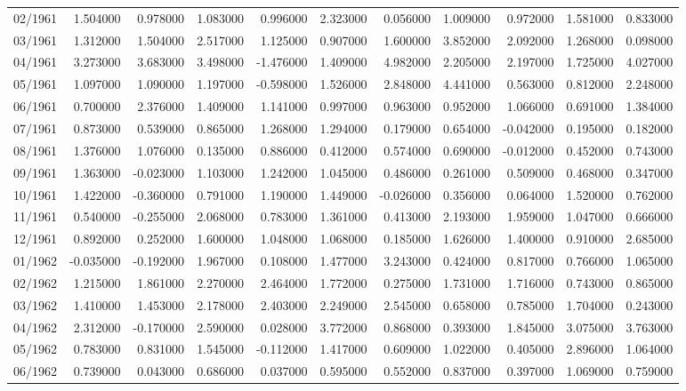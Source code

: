 \begin{tabular}{lrrrrrrrrrr}
02/1961 & 1.504000 & 0.978000 & 1.083000 & 0.996000 & 2.323000 & 0.056000 & 1.009000 & 0.972000 & 1.581000 & 0.833000 \\
03/1961 & 1.312000 & 1.504000 & 2.517000 & 1.125000 & 0.907000 & 1.600000 & 3.852000 & 2.092000 & 1.268000 & 0.098000 \\
04/1961 & 3.273000 & 3.683000 & 3.498000 & -1.476000 & 1.409000 & 4.982000 & 2.205000 & 2.197000 & 1.725000 & 4.027000 \\
05/1961 & 1.097000 & 1.090000 & 1.197000 & -0.598000 & 1.526000 & 2.848000 & 4.441000 & 0.563000 & 0.812000 & 2.248000 \\
06/1961 & 0.700000 & 2.376000 & 1.409000 & 1.141000 & 0.997000 & 0.963000 & 0.952000 & 1.066000 & 0.691000 & 1.384000 \\
07/1961 & 0.873000 & 0.539000 & 0.865000 & 1.268000 & 1.294000 & 0.179000 & 0.654000 & -0.042000 & 0.195000 & 0.182000 \\
08/1961 & 1.376000 & 1.076000 & 0.135000 & 0.886000 & 0.412000 & 0.574000 & 0.690000 & -0.012000 & 0.452000 & 0.743000 \\
09/1961 & 1.363000 & -0.023000 & 1.103000 & 1.242000 & 1.045000 & 0.486000 & 0.261000 & 0.509000 & 0.468000 & 0.347000 \\
10/1961 & 1.422000 & -0.360000 & 0.791000 & 1.190000 & 1.449000 & -0.026000 & 0.356000 & 0.064000 & 1.520000 & 0.762000 \\
11/1961 & 0.540000 & -0.255000 & 2.068000 & 0.783000 & 1.361000 & 0.413000 & 2.193000 & 1.959000 & 1.047000 & 0.666000 \\
12/1961 & 0.892000 & 0.252000 & 1.600000 & 1.048000 & 1.068000 & 0.185000 & 1.626000 & 1.400000 & 0.910000 & 2.685000 \\
01/1962 & -0.035000 & -0.192000 & 1.967000 & 0.108000 & 1.477000 & 3.243000 & 0.424000 & 0.817000 & 0.766000 & 1.065000 \\
02/1962 & 1.215000 & 1.861000 & 2.270000 & 2.464000 & 1.772000 & 0.275000 & 1.731000 & 1.716000 & 0.743000 & 0.865000 \\
03/1962 & 1.410000 & 1.453000 & 2.178000 & 2.403000 & 2.249000 & 2.545000 & 0.658000 & 0.785000 & 1.704000 & 0.243000 \\
04/1962 & 2.312000 & -0.170000 & 2.590000 & 0.028000 & 3.772000 & 0.868000 & 0.393000 & 1.845000 & 3.075000 & 3.763000 \\
05/1962 & 0.783000 & 0.831000 & 1.545000 & -0.112000 & 1.417000 & 0.609000 & 1.022000 & 0.405000 & 2.896000 & 1.064000 \\
06/1962 & 0.739000 & 0.043000 & 0.686000 & 0.037000 & 0.595000 & 0.552000 & 0.837000 & 0.397000 & 1.069000 & 0.759000 \\

\end{tabular}
